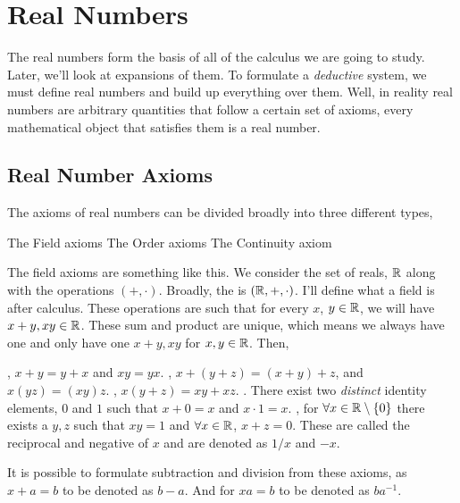 \chapter{Real Numbers}

The real numbers form the basis of all of the calculus we are going to study. Later, we'll look at expansions of them.
To formulate a \emph{deductive} system, we must define real numbers and build up everything over them. Well, in reality
real numbers are arbitrary quantities that follow a certain set of axioms, every mathematical object that satisfies
them is a real number.

\section{Real Number Axioms}

The axioms of real numbers can be divided broadly into three different types,

\begin{itemize}
    \ii The Field axioms
    \ii The Order axioms
    \ii The Continuity axiom
\end{itemize}

The field axioms are something like this. We consider the set of reals, \(\mathbb R\) along with the operations \((+, \cdot)\). Broadly,
the  is \((\mathbb R, +, \cdot)\). I'll define what a field is after calculus. These operations are such that for every
\(x\), \(y \in \mathbb R\), we will have \(x + y, xy \in \mathbb R\). These sum and product are unique, which means we always have one 
and only have one \(x+y, xy\) for \(x, y \in \mathbb R\). Then,

\begin{axioms}
    \ii {}, \(x+y = y+x\) and \(xy = yx\).
    \ii {}, \(x + (y+z) = (x+y) + z\), and \(x(yz) = (xy)z\).
    \ii {}, \(x(y + z) = xy + xz\).
    \ii {}. There exist two \emph{distinct} identity elements, \(0\) and \(1\) such that \(x + 0 = x\) and \(x \cdot 1 = x\).
    \ii {}, for \(\forall x \in \mathbb R \setminus \{0\}\) there exists a \(y, z\) such that \(xy = 1\) and \(\forall x \in \mathbb R\), \(x + z = 0\). These are called the reciprocal 
    and negative of \(x\) and are denoted as \(1/x\) and \(-x\).
\end{axioms}
 
It is possible to formulate subtraction and division from these axioms, as \(x + a = b\) to be denoted as \(b - a\). And for 
\(xa = b\) to be denoted as \(ba^{-1}\). 